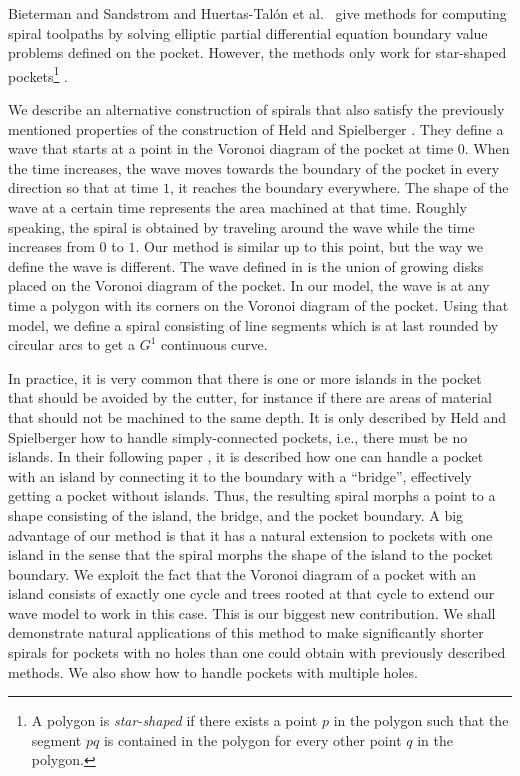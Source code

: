 \documentclass[3p]{elsarticle}
\begin{document}
Bieterman and Sandstrom \cite{bieterman2003} and Huertas-Tal{\'o}n et al.~\cite{huertas2014}
give methods
for computing spiral toolpaths by solving elliptic partial differential equation
boundary value problems defined on the pocket. However, the methods only work
for star-shaped pockets\footnote{A polygon is \emph{star-shaped} if there
exists a point $p$ in the polygon such that the segment $pq$ is contained in the polygon
for every other point $q$ in the polygon.} \cite{held2009}.

We describe an alternative construction of spirals that also satisfy the previously mentioned properties
of the construction of Held and Spielberger \cite{held2009}.
They define a wave that starts at a point in the Voronoi diagram of the pocket at time
$0$. When the time increases, the wave moves towards the boundary of the
pocket in every direction so that at time $1$,
it reaches the boundary everywhere. The shape of the wave at a certain time represents
the area machined at that time. Roughly speaking,
the spiral is obtained by traveling around the wave while the time
increases from $0$ to $1$.
Our method is similar up to this point, but the way we define the wave is different.
The wave defined in \cite{held2009} is the union of growing
disks placed on the Voronoi diagram of the pocket.
In our model, the wave is at any time a polygon with its corners on
the Voronoi diagram of the pocket.
Using that model, we define a spiral consisting of line segments which is
at last rounded by circular arcs to get a $G^1$ continuous curve.

In practice, it is very common that there is one or more islands in the
pocket that should be avoided by the cutter, for instance if there are areas of material that should
not be machined to the same depth.
It is only described by Held and Spielberger \cite{held2009} how to handle simply-connected
pockets, i.e., there must be no islands.
In their following paper \cite{held2014}, it is described how one can handle a pocket with an island
by connecting it to the boundary with a ``bridge'', effectively getting a pocket without islands.
Thus, the resulting spiral morphs a point to a shape consisting of the island,
the bridge, and the pocket boundary.
A big advantage of our method is that it has a natural extension to pockets with one
island in the sense that the spiral morphs the shape of the island to the pocket boundary.
We exploit the fact that the Voronoi diagram of a pocket with an island consists of exactly one cycle
and trees rooted at that cycle to extend our wave model to work in this case.
This is our biggest new contribution. We shall demonstrate natural applications of this method
to make significantly shorter spirals for pockets with no holes than one could obtain with previously described methods. We also show how to handle pockets with multiple holes.
\end{document}
